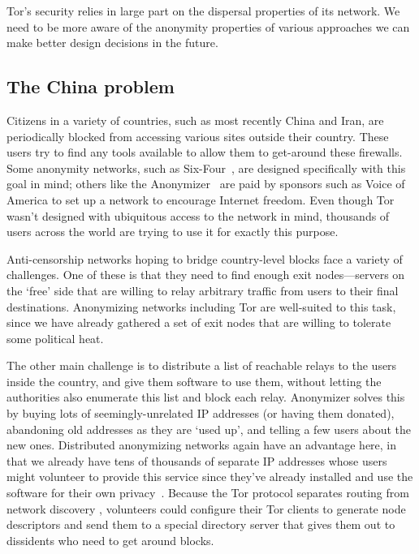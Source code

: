 \documentclass{llncs}
\begin{document}
Tor's security relies in large part on the dispersal properties of its
network. We need to be more aware of the anonymity properties of various
approaches we can make better design decisions in the future.

\subsection{The China problem}
\label{subsec:china}

Citizens in a variety of countries, such as most recently China and
Iran, are periodically blocked from accessing various sites outside
their country. These users try to find any tools available to allow
them to get-around these firewalls. Some anonymity networks, such as
Six-Four~\cite{six-four}, are designed specifically with this goal in
mind; others like the Anonymizer~\cite{anonymizer} are paid by sponsors
such as Voice of America to set up a network to encourage Internet
freedom. Even though Tor wasn't
designed with ubiquitous access to the network in mind, thousands of
users across the world are trying to use it for exactly this purpose.

Anti-censorship networks hoping to bridge country-level blocks face
a variety of challenges. One of these is that they need to find enough
exit nodes---servers on the `free' side that are willing to relay
arbitrary traffic from users to their final destinations. Anonymizing
networks including Tor are well-suited to this task, since we have
already gathered a set of exit nodes that are willing to tolerate some
political heat.

The other main challenge is to distribute a list of reachable relays
to the users inside the country, and give them software to use them,
without letting the authorities also enumerate this list and block each
relay. Anonymizer solves this by buying lots of seemingly-unrelated IP
addresses (or having them donated), abandoning old addresses as they are
`used up', and telling a few users about the new ones. Distributed
anonymizing networks again have an advantage here, in that we already
have tens of thousands of separate IP addresses whose users might
volunteer to provide this service since they've already installed and use
the software for their own privacy~\cite{koepsell:wpes2004}. Because
the Tor protocol separates routing from network discovery \cite{tor-design},
volunteers could configure their Tor clients
to generate node descriptors and send them to a special directory
server that gives them out to dissidents who need to get around blocks.
\end{document}
